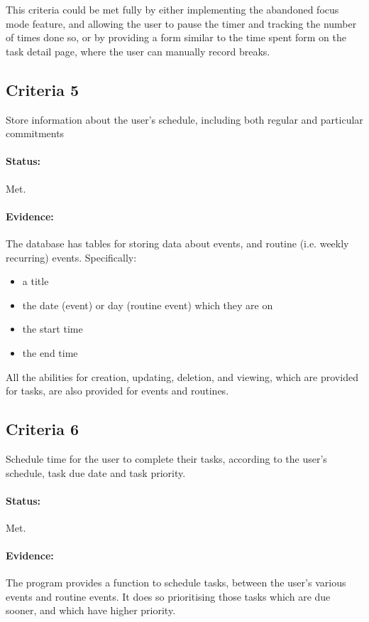 \documentclass{article}
\begin{document}
This criteria could be met fully by either implementing the abandoned focus mode feature,
and allowing the user to pause the timer and tracking the number of times done so,
or by providing a form similar to the time spent form on the task detail page,
where the user can manually record breaks.

\subsection{Criteria 5}
Store information about the user's schedule,
including both regular and particular commitments

\paragraph{Status:}
Met.

\paragraph{Evidence:}
The database has tables for storing data about events,
and routine (i.e. weekly recurring) events.
Specifically:
\begin{itemize}
  \item a title
  \item the date (event) or day (routine event) which they are on
  \item the start time
  \item the end time
\end{itemize}

All the abilities for creation, updating, deletion, and viewing,
which are provided for tasks,
are also provided for events and routines.

\subsection{Criteria 6}
Schedule time for the user to complete their tasks, according to the
user's schedule, task due date and task priority.

\paragraph{Status:}
Met.

\paragraph{Evidence:}
The program provides a function to schedule tasks,
between the user's various events and routine events.
It does so prioritising those tasks which are due sooner,
and which have higher priority.
\end{document}
